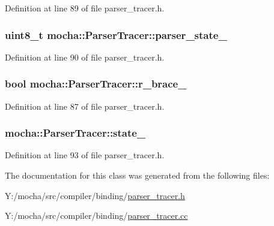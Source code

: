 Definition at line 89 of file parser\_\-tracer.h.

\hypertarget{classmocha_1_1_parser_tracer_a114c5f058d10f88c349347528ba60bfe}{
\subsubsection[{parser\_\-state\_\-}]{\setlength{\rightskip}{0pt plus 5cm}uint8\_\-t {\bf mocha::ParserTracer::parser\_\-state\_\-}}}
\label{classmocha_1_1_parser_tracer_a114c5f058d10f88c349347528ba60bfe}


Definition at line 90 of file parser\_\-tracer.h.

\hypertarget{classmocha_1_1_parser_tracer_a68ddbc5b5c22bd599d86ad7e82598a8d}{
\subsubsection[{r\_\-brace\_\-}]{\setlength{\rightskip}{0pt plus 5cm}bool {\bf mocha::ParserTracer::r\_\-brace\_\-}}}
\label{classmocha_1_1_parser_tracer_a68ddbc5b5c22bd599d86ad7e82598a8d}


Definition at line 87 of file parser\_\-tracer.h.

\hypertarget{classmocha_1_1_parser_tracer_a8663013c09f0c7788bc5a26715fdc746}{
\subsubsection[{state\_\-}]{ {\bf mocha::ParserTracer::state\_\-}}}
\label{classmocha_1_1_parser_tracer_a8663013c09f0c7788bc5a26715fdc746}


Definition at line 93 of file parser\_\-tracer.h.



The documentation for this class was generated from the following files:\begin{DoxyCompactItemize}
\item 
Y:/mocha/src/compiler/binding/\hyperlink{parser__tracer_8h}{parser\_\-tracer.h}\item 
Y:/mocha/src/compiler/binding/\hyperlink{parser__tracer_8cc}{parser\_\-tracer.cc}\end{DoxyCompactItemize}
